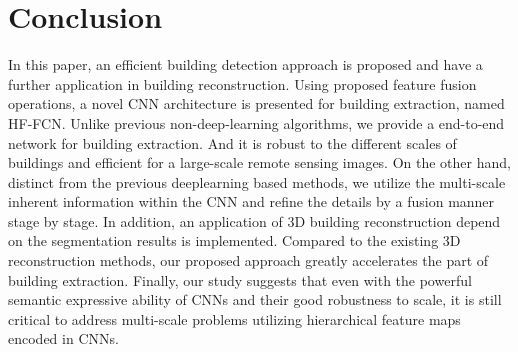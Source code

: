 \section{Conclusion}
\label{Sec:Con}
 In this paper, an efficient building detection approach is proposed and have a further application in building reconstruction.
 Using proposed feature fusion operations, a novel CNN architecture is presented for building extraction, named HF-FCN.
 Unlike previous non-deep-learning algorithms, we provide a end-to-end network for building extraction.
 And it is robust to the different scales of buildings and efficient for a large-scale remote sensing images.
 On the other hand, distinct from the previous deeplearning based methods, we utilize the multi-scale inherent information within the CNN and refine the details by a fusion manner stage by stage.
 In addition, an application of 3D building reconstruction depend on the segmentation results is implemented.
 Compared to the existing 3D reconstruction methods, our proposed approach greatly accelerates the part of building extraction.
 Finally, our study suggests that even with the powerful semantic expressive ability of CNNs and their good robustness to scale, it is still critical to address multi-scale problems utilizing hierarchical feature maps encoded in CNNs.

